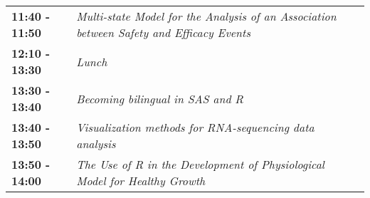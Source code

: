 \documentclass[]{book}
\theoremstyle{definition}
\theoremstyle{definition}
\theoremstyle{definition}
\theoremstyle{remark}
\begin{document}
\begin{longtable}[]{@{}lll@{}}
\begin{minipage}[t]{0.30\columnwidth}
\textbf{11:40 - 11:50}\strut
\end{minipage} & \begin{minipage}[t]{0.30\columnwidth}\raggedright
\emph{Multi-state Model for the Analysis of an Association between
Safety and Efficacy Events}\strut
\end{minipage} & \begin{minipage}[t]{0.30\columnwidth}\raggedright
\strut
\end{minipage}\tabularnewline
\begin{minipage}[t]{0.30\columnwidth}\raggedright
\textbf{12:10 - 13:30}\strut
\end{minipage} & \begin{minipage}[t]{0.30\columnwidth}\raggedright
\emph{Lunch}\strut
\end{minipage} & \begin{minipage}[t]{0.30\columnwidth}\raggedright
\strut
\end{minipage}\tabularnewline
\begin{minipage}[t]{0.30\columnwidth}\raggedright
\textbf{13:30 - 13:40}\strut
\end{minipage} & \begin{minipage}[t]{0.30\columnwidth}\raggedright
\emph{Becoming bilingual in SAS and R}\strut
\end{minipage} & \begin{minipage}[t]{0.30\columnwidth}\raggedright
\strut
\end{minipage}\tabularnewline
\begin{minipage}[t]{0.30\columnwidth}\raggedright
\textbf{13:40 - 13:50}\strut
\end{minipage} & \begin{minipage}[t]{0.30\columnwidth}\raggedright
\emph{Visualization methods for RNA-sequencing data analysis}\strut
\end{minipage} & \begin{minipage}[t]{0.30\columnwidth}\raggedright
\strut
\end{minipage}\tabularnewline
\begin{minipage}[t]{0.30\columnwidth}\raggedright
\textbf{13:50 - 14:00}\strut
\end{minipage} & \begin{minipage}[t]{0.30\columnwidth}\raggedright
\emph{The Use of R in the Development of Physiological Model for Healthy
Growth}\strut
\end{minipage} & \begin{minipage}[t]{0.30\columnwidth}\raggedright

\end{minipage}
\end{longtable}
\end{document}
